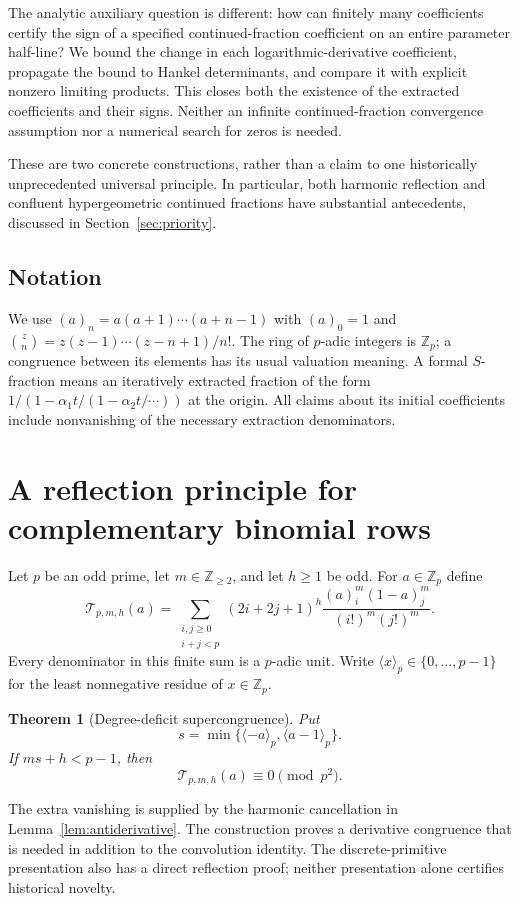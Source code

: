 \documentclass[11pt,a4paper]{article}
\newtheorem{theorem}{Theorem}[section]
\theoremstyle{remark}
\newcommand{\Zp}{\mathbb Z_p}
\begin{document}
The analytic auxiliary question is different: how can finitely many
coefficients certify the sign of a specified continued-fraction
coefficient on an entire parameter half-line? We bound the change in
each logarithmic-derivative coefficient, propagate the bound to Hankel
determinants, and compare it with explicit nonzero limiting products.
This closes both the existence of the extracted coefficients and their
signs. Neither an infinite continued-fraction convergence assumption
nor a numerical search for zeros is needed.

These are two concrete constructions, rather than a claim to one
historically unprecedented universal principle. In particular, both
harmonic reflection and confluent hypergeometric continued fractions
have substantial antecedents, discussed in Section~\ref{sec:priority}.

\subsection{Notation}
We use $(a)_n=a(a+1)\cdots(a+n-1)$ with $(a)_0=1$ and
$\binom zn=z(z-1)\cdots(z-n+1)/n!$. The ring of $p$-adic integers is
$\Zp$; a congruence between its elements has its usual valuation
meaning. A formal $S$-fraction means an iteratively extracted fraction
of the form $1/(1-\alpha_1t/(1-\alpha_2t/\cdots))$ at the origin.
All claims about its initial coefficients include nonvanishing of the
necessary extraction denominators.
\section{A reflection principle for complementary binomial rows}

Let $p$ be an odd prime, let $m\in\mathbb Z_{\ge2}$, and let $h\ge1$ be odd.
For $a\in\mathbb Z_p$ define
\[
 \mathcal T_{p,m,h}(a)=
 \sum_{\substack{i,j\ge0\\i+j<p}}(2i+2j+1)^h
       \frac{(a)_i^m(1-a)_j^m}{(i!)^m(j!)^m}.
\]
Every denominator in this finite sum is a $p$-adic unit.
Write $\langle x\rangle_p\in\{0,\ldots,p-1\}$ for the least
nonnegative residue of $x\in\mathbb Z_p$.

\begin{theorem}[Degree-deficit supercongruence]\label{thm:degree-deficit}
Put
\[
 s=\min\{\langle-a\rangle_p,\langle a-1\rangle_p\}.
\]
If $ms+h<p-1$, then
\[
             \mathcal T_{p,m,h}(a)\equiv0\pmod{p^2}.
\]
\end{theorem}

The extra vanishing is supplied by the harmonic cancellation in
Lemma~\ref{lem:antiderivative}. The construction proves a derivative
congruence that is needed in addition to the convolution identity.
The discrete-primitive presentation also has a direct reflection proof;
neither presentation alone certifies historical novelty.
\end{document}
